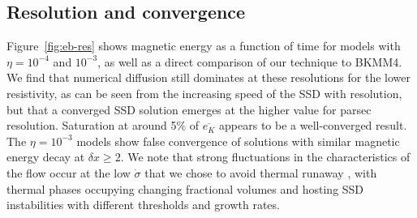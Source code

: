 \documentclass[preprint2]{aastex63}
\newcommand\SNr{\dot\sigma_{\rm sn}}
\newcommand\dx{ {\delta x}}
\newcommand\BKM{{\sf BKMM4}}
\newcommand{\fg}[1]{\textcolor{midgreen}{#1}}
\newcommand{\mm}[1]{\textcolor{mypurple}{#1}}
\begin{document}
\subsection{\fg{Resolution and convergence}} \label{sec:conv}

\mm{Figure~\ref{fig:eb-res} shows magnetic energy as a function of
  time for models with $\eta = 10^{-4}$ and $10^{-3}$, as well as a
  direct comparison of our technique to \BKM.   We find that numerical
diffusion still dominates at these resolutions for the lower
resistivity, as can be seen from the increasing speed of the SSD with
resolution, but that a converged SSD solution emerges at the higher 
value for parsec resolution.}
 Saturation at around 5\% of $\overline{e_K}$ appears to be a well-converged
 result.
%
\mm{The $\eta = 10^{-3}$ models show}
 false convergence
 \citep{FMA91} of solutions with similar magnetic energy decay at $\dx\geq2$.
 \fg{We note that strong fluctuations in the characteristics of the
   flow
   \mm{occur at the}
 low $\dot\sigma$ \mm{that we chose to avoid thermal runaway
   \citep{LOCBN15},} with thermal phases occupying changing fractional volumes
 \citep[e.g.][]{gatto2015} and hosting SSD instabilities with different 
 thresholds and growth rates.
 }
  
\end{document}
